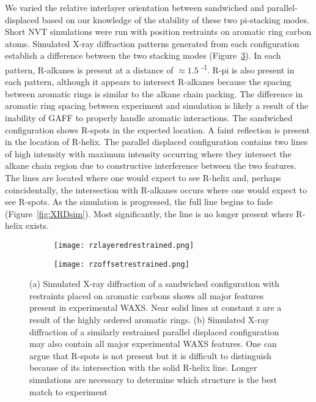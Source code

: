 We varied the relative interlayer orientation between sandwiched and 
parallel-displaced based on our knowledge of the stability of these two
pi-stacking modes. Short NVT simulations were run with position restraints
on aromatic ring carbon atoms. Simulated X-ray diffraction patterns 
generated from each configuration establish a difference between the two
stacking modes (Figure~\ref{fig:XRDrestrained}). In each pattern, R-alkanes is present at a distance of
$\approx 1.5$ \angstrom \textsuperscript{-1}. R-pi is also present in each 
pattern, although it appears to intersect R-alkanes because the spacing
between aromatic rings is similar to the alkane chain packing. The difference 
in aromatic ring spacing between experiment and simulation is likely a result
of the inability of GAFF to properly handle aromatic interactions. The 
sandwiched configuration shows R-spots in the expected location. A faint
reflection is present in the location of R-helix. The parallel
displaced configuration contains two lines of high intensity with maximum
intensity occurring where they intersect the alkane chain region due to
constructive interference between the two features. The lines are located
where one would expect to see R-helix and, perhaps coincidentally, the 
intersection with R-alkanes occurs where one would expect to see R-spots.
As the simulation is progressed, the full line begins to fade 
(Figure~\ref{fig:XRDsim}). Most significantly, the line is no longer present
where R-helix exists.

\begin{figure}
	\centering
	\begin{subfigure}{0.475\textwidth}
		\hspace{-1.2cm}
		\centering
		\texttt{[image: rzlayeredrestrained.png]}
		\caption{}\label{fig:rzplayeredrestrained}
	\end{subfigure}
	\begin{subfigure}{0.475\textwidth}
		\hspace{-1.2cm}
		\centering
		\texttt{[image: rzoffsetrestrained.png]}
		\caption{}\label{fig:rzoffsetrestrained}
	\end{subfigure}
	\caption{(a) Simulated X-ray diffraction of a sandwiched configuration
	with restraints placed on aromatic carbons shows all major features
	present in experimental WAXS. Near solid lines at constant z are a result of 
	the highly ordered aromatic rings. (b) Simulated X-ray diffraction of a similarly
	restrained parallel displaced configuration may also contain all
	major experimental WAXS features. One can argue that R-spots is not present
	but it is difficult to distinguish because of its intersection with the solid
	R-helix line. Longer simulations are necessary to determine which structure
	is the best match to experiment}\label{fig:XRDrestrained}
\end{figure}

